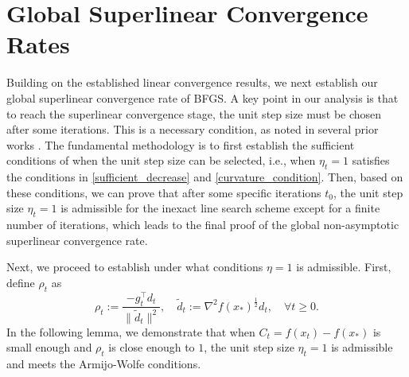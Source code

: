 \documentclass[11pt,letterpaper]{article}
\newcommand\0{{\Vector{0}}}
\newcommand\1{{\Vector{1}}}
\numberwithin{assumption}{section}
\numberwithin{definition}{section}
\numberwithin{theorem}{section}
\numberwithin{remark}{section}
\begin{document}



\section{Global Superlinear Convergence Rates}\label{sec:superlinear}

Building on the established linear convergence results, we next establish our global superlinear convergence rate of BFGS. A key point in our analysis is that to reach the superlinear convergence stage, the unit step size must be chosen after some iterations. This is a necessary condition, as noted in several prior works \cite{powell1971convergence,Powell,byrd1987global,QN_tool}. The fundamental methodology is to first establish the sufficient conditions of when the unit step size can be selected, i.e., when $\eta_t = 1$ satisfies the conditions in \eqref{sufficient_decrease} and \eqref{curvature_condition}. Then, based on these conditions, we can prove that after some specific iterations $t_0$, the unit step size $\eta_t = 1$ is admissible for the inexact line search scheme except for a finite number of iterations, which leads to the final proof of the global non-asymptotic superlinear convergence rate.

Next, we proceed to establish under what conditions $\eta=1$ is admissible. 
First, define $\rho_t$ as
\begin{equation}\label{definition_rho}
    \rho_t := \frac{-g_t^\top d_t}{\|\tilde{d}_t\|^2}, \quad \tilde{d}_t := \nabla^2{f(x_*)}^{\frac{1}{2}}d_t, \quad \forall t \geq 0.
\end{equation}
In the following lemma, we demonstrate that when $C_t = f(x_t) - f(x_*)$ is small enough and  $\rho_t$ is close enough to $1$, the unit step size $\eta_t=1$ is admissible and meets the Armijo-Wolfe conditions. %
\end{document}
